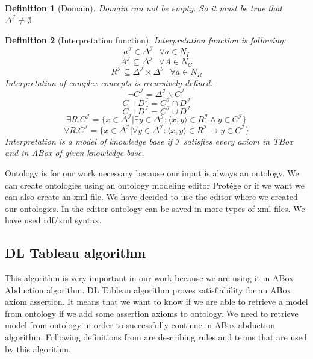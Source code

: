 \documentclass[12pt,a4paper]{article}
\newtheorem{definition}{Definition}[subsection]
\begin{document}
\begin{definition}[Domain]
	Domain can not be empty. So it must be true that $\Delta^{\mathcal{I}} \not = \emptyset$.
\end{definition}

\begin{definition}[Interpretation function]
	Interpretation function is following:
	\[ a^{\mathcal{I}} \in \Delta^{\mathcal{I}} \text{ } \forall a \in N_{I} \]
	\[ A^{\mathcal{I}} \subseteq \Delta^{\mathcal{I}} \text{ } \forall A \in N_{C} \]
	\[ R^{\mathcal{I}} \subseteq \Delta^{\mathcal{I}} \times \Delta^{\mathcal{I}} \text{ } \forall a \in N_{R} \]
	Interpretation of complex concepts is recursively defined:
	\[ \neg C^{\mathcal{I}} = \Delta^{\mathcal{I}} \backslash C^{\mathcal{I}} \]
	\[ C \sqcap D^{\mathcal{I}} = C^{\mathcal{I}} \cap D^{\mathcal{I}} \]
	\[ C \sqcup D^{\mathcal{I}} = C^{\mathcal{I}} \cup D^{\mathcal{I}} \]
	\[ \exists R.C^{\mathcal{I}} = \{ x \in \Delta^{\mathcal{I}} | \exists y \in \Delta^{\mathcal{I}} : \langle x,y \rangle \in R^{\mathcal{I}} \land y \in C^{\mathcal{I}} \} \]
	\[ \forall R.C^{\mathcal{I}} = \{ x \in \Delta^{\mathcal{I}} | \forall y \in \Delta^{\mathcal{I}} : \langle x,y \rangle \in R^{\mathcal{I}} \rightarrow y \in C^{\mathcal{I}} \} \]
	Interpretation is a model of knowledge base if $\mathcal{I}$ satisfies every axiom in \textit{TBox} and in \textit{ABox} of given knowledge base.
\end{definition}

Ontology is for our work necessary because our input is always an ontology. We can create ontologies using an ontology modeling editor Protége or if we want we can also create an xml file. We have decided to use the editor where we created our ontologies. In the editor ontology can be saved in more types of xml files. We have used rdf/xml syntax.


\subsection{DL Tableau algorithm}
This algorithm is very important in our work because we are using it in ABox Abduction algorithm. DL Tableau algorithm proves satisfiability for an ABox axiom assertion. It means that we want to know if we are able to retrieve a model from ontology if we add some assertion axioms to ontology. We need to retrieve model from ontology in order to successfully continue in ABox abduction algorithm. Following definitions from \citep{baaderHandbook} are describing rules and terms that are used by this algorithm.
\end{document}
